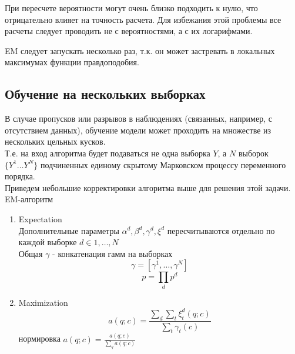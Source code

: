 \documentclass{matmex-diploma-custom}
\begin{document}
\begin{remark} При пересчете вероятности могут очень близко подходить к нулю, что отрицательно влияет на точность расчета. Для избежания этой проблемы все расчеты следует проводить не с вероятностями, а с их логарифмами.
\end{remark}
\begin{remark} EM следует запускать несколько раз, т.к. он может застревать в локальных максимумах функции правдоподобия.
\end{remark}

\subsection{Обучение на нескольких выборках}
В случае пропусков или разрывов в наблюдениях (связанных, например, с отсутствием данных), обучение модели может проходить на множестве из нескольких цельных кусков.
\\
Т.е. на вход алгоритма будет подаваться не одна выборка $Y$, а                                                                                                                                                                                                                                                                                                                                                                                                                                                                                                                                                                                                                                                              $ N $ выборок $ \{Y^{1} \ldots Y^{N}\}$ подчиненных единому скрытому Марковском процессу переменного порядка.
\\
Приведем небольшие корректировки алгоритма выше для решения этой задачи.
\\
EM-алгоритм
\begin{enumerate}
\item Expectation\\
Дополнительные параметры $\alpha^{d}, \beta^{d}, \gamma^{d}, \xi^{d}$ пересчитываются отдельно по каждой выборке $d \in {1, \ldots, N}$
\\
Общая $\gamma$ - конкатенация гамм на выборках
$$ \gamma = [\gamma^{1}, \ldots ,\gamma^{N}] $$
$$ p = \prod_{d}{p^{d}}$$
\item Maximization\\
$$ a(q; c) = \frac{\sum_{d}{\sum_{t}{\xi^{d}_{t}(q;c)}}}{\sum_{t}{\gamma_{t}(c)}} $$
нормировка
$ a(q; c) = \frac{a(q;c)}{\sum_{q}{a(q;c)}} $
\end{enumerate}
\end{document}
